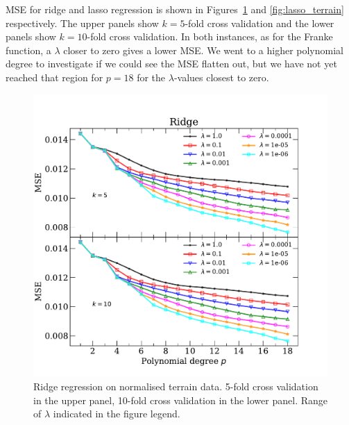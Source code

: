 \documentclass[a4paper, 
amsfonts, 
amssymb, 
amsmath, 
reprint, 
showkeys, 
nofootinbib, 
twoside]{revtex4-2}
\begin{document}
MSE for ridge and lasso regression is shown in Figures~\ref{fig:ridge_terrain} and \ref{fig:lasso_terrain} respectively. The upper panels show $k = 5$-fold cross validation and the lower panels show $k = 10$-fold cross validation. In both instances, as for the Franke function, a $\lambda$ closer to zero gives a lower MSE. We went to a higher polynomial degree to investigate if we could see the MSE flatten out, but we have not yet reached that region for $p = 18$ for the $\lambda$-values closest to zero. 

\begin{figure}
    \centering
    \includegraphics[width = \columnwidth]{Figures/terrain_scaled_ridge.pdf}
    \caption{Ridge regression on normalised terrain data. 5-fold cross validation in the upper panel, 10-fold cross validation in the lower panel. Range of $\lambda$ indicated in the figure legend.  }
    \label{fig:ridge_terrain}
\end{figure}
\end{document}
